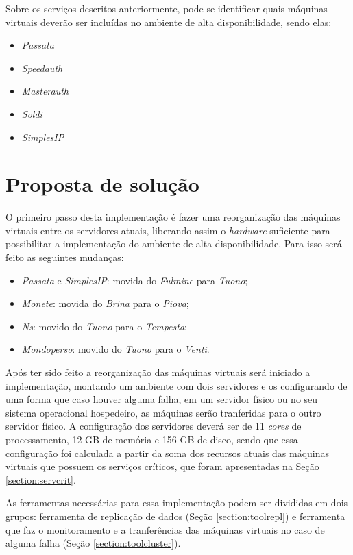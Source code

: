 Sobre os serviços descritos anteriormente, pode-se identificar quais máquinas virtuais deverão ser incluídas no 
ambiente de alta disponibilidade, sendo elas:
\begin{itemize}
 \item \textit{Passata}
 \item \textit{Speedauth}
 \item \textit{Masterauth}
 \item \textit{Soldi}
 \item \textit{SimplesIP}
\end{itemize}

\section{Proposta de solução}
\label{section:propostasolucao}

O primeiro passo desta implementação é fazer uma reorganização das máquinas virtuais entre os servidores atuais, liberando assim o 
\textit{hardware} suficiente para possibilitar a implementação do ambiente de alta disponibilidade. 
Para isso será feito as seguintes mudanças:
\begin{itemize}
 \item \textit{Passata} e \textit{SimplesIP}: movida do \textit{Fulmine} para \textit{Tuono};
 \item \textit{Monete}: movida do \textit{Brina} para o \textit{Piova};
 \item \textit{Ns}: movido do \textit{Tuono} para o \textit{Tempesta};
 \item \textit{Mondoperso}: movido do \textit{Tuono} para o \textit{Venti}.
\end{itemize}

Após ter sido feito a reorganização das máquinas virtuais será iniciado a implementação, montando um ambiente com dois servidores e os 
configurando de uma forma que caso houver alguma falha, em um servidor físico ou no seu sistema operacional hospedeiro, as máquinas serão 
tranferidas para o outro servidor físico. 
A configuração dos servidores deverá ser de 11 \textit{cores} de processamento, 12 GB de memória e 156 GB de disco, sendo que essa configuração 
foi calculada a partir da soma dos recursos atuais das máquinas virtuais que possuem os serviços críticos, que foram apresentadas na Seção 
\ref{section:servcrit}.

As ferramentas necessárias para essa implementação podem ser divididas em dois grupos: ferramenta de replicação de dados 
(Seção \ref{section:toolrepl}) e ferramenta que faz o monitoramento e a tranferências das máquinas virtuais no caso de alguma falha 
(Seção \ref{section:toolcluster}).

